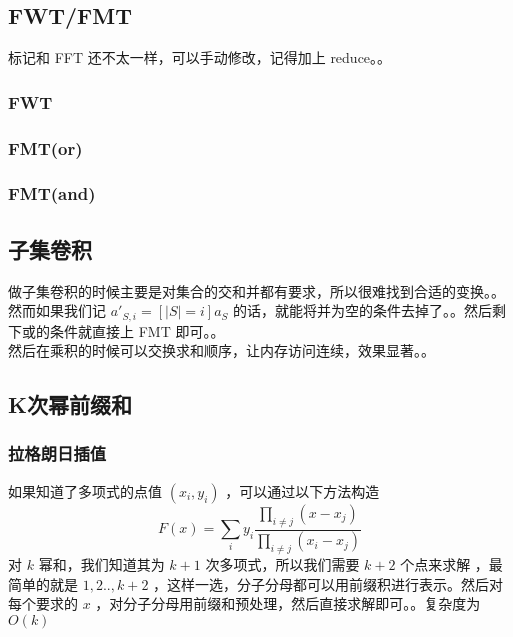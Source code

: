 	\subsection{FWT/FMT}
	标记和 FFT 还不太一样，可以手动修改，记得加上 reduce。。\\
	\subsubsection{FWT}
	
	\vspace{1cm}
	\subsubsection{FMT(or)}
	
	\vspace{1cm}
	\subsubsection{FMT(and)}
	
	\newpage
	\subsection{子集卷积}
	做子集卷积的时候主要是对集合的交和并都有要求，所以很难找到合适的变换。。然而如果我们记 $a'_{S,i}=[|S|=i]a_S$ 的话，就能将并为空的条件去掉了。。然后剩下或的条件就直接上 FMT 即可。。\\
	然后在乘积的时候可以交换求和顺序，让内存访问连续，效果显著。。\\
	\vspace{2cm}
	
	\newpage
	\subsection{K次幂前缀和}
	\subsubsection{拉格朗日插值}
	如果知道了多项式的点值 $(x_i,y_i)$ ，可以通过以下方法构造
	$$
	F(x)=\sum_i y_i\frac{\displaystyle\prod_{i\neq j}(x-x_j)}{\displaystyle\prod_{i\neq j}(x_i-x_j)}
	$$
	对 $k$ 幂和，我们知道其为 $k+1$ 次多项式，所以我们需要 $k+2$ 个点来求解 ，最简单的就是 $1,2..,k+2$ ，这样一选，分子分母都可以用前缀积进行表示。然后对每个要求的 $x$ ，对分子分母用前缀和预处理，然后直接求解即可。。复杂度为 $O(k)$\\
	
	~\\
